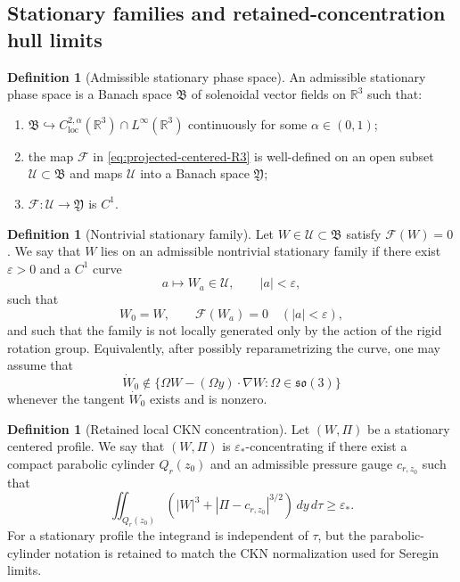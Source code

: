 \documentclass[11pt]{amsart}
\numberwithin{equation}{section}
\theoremstyle{plain}
\theoremstyle{definition}
\newtheorem{definition}[theorem]{Definition}
\theoremstyle{remark}
\newcommand{\loc}{\mathrm{loc}}
\begin{document}
\subsection{Stationary families and retained-concentration hull limits}

\begin{definition}[Admissible stationary phase space]
\label{def:R3-stationary-phase-space}
An admissible stationary phase space is a Banach space \(\mathfrak B\) of
solenoidal vector fields on \(\mathbb R^3\) such that:
\begin{enumerate}[label=(\roman*)]
   \item \(\mathfrak B\hookrightarrow C^{2,\alpha}_{\loc}(\mathbb R^3)
      \cap L^\infty(\mathbb R^3)\) continuously for some
      \(\alpha\in(0,1)\);
   \item the map \(\mathcal F\) in \eqref{eq:projected-centered-R3} is
      well-defined on an open subset \(\mathcal U\subset\mathfrak B\) and maps
      \(\mathcal U\) into a Banach space \(\mathfrak Y\);
   \item \(\mathcal F:\mathcal U\to\mathfrak Y\) is \(C^1\).
\end{enumerate}
\end{definition}

\begin{definition}[Nontrivial stationary family]
\label{def:R3-stationary-family}
Let \(W\in\mathcal U\subset\mathfrak B\) satisfy \(\mathcal F(W)=0\).  We say
that \(W\) lies on an admissible nontrivial stationary family if there exist
\(\varepsilon>0\) and a \(C^1\) curve
\[
   a\mapsto W_a\in\mathcal U,
   \qquad |a|<\varepsilon,
\]
such that
\begin{equation}\label{eq:R3-stationary-family}
   W_0=W,
   \qquad
   \mathcal F(W_a)=0 \quad (|a|<\varepsilon),
\end{equation}
and such that the family is not locally generated only by the action of the
rigid rotation group.  Equivalently, after possibly reparametrizing the curve,
one may assume that
\begin{equation}\label{eq:R3-nontrivial-tangent}
   \dot W_0\notin
   \{\Omega W-(\Omega y)\cdot\nabla W:\Omega\in\mathfrak{so}(3)\}
\end{equation}
whenever the tangent \(\dot W_0\) exists and is nonzero.
\end{definition}

\begin{definition}[Retained local CKN concentration]
\label{def:R3-active-profile}
Let \((W,\Pi)\) be a stationary centered profile.  We say that \((W,\Pi)\) is
\(\varepsilon_*\)-concentrating if there exist a compact parabolic cylinder
\(Q_r(z_0)\) and an admissible pressure gauge \(c_{r,z_0}\) such that
\begin{equation}\label{eq:R3-active-ckn}
   \iint_{Q_r(z_0)}
   \left(|W|^3+|\Pi-c_{r,z_0}|^{3/2}\right)\,dy\,d\tau
   \ge \varepsilon_* .
\end{equation}
For a stationary profile the integrand is independent of \(\tau\), but the
parabolic-cylinder notation is retained to match the CKN normalization used for
Seregin limits.
\end{definition}
\end{document}

